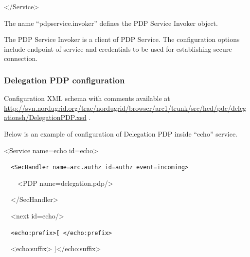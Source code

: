 \documentclass{article}
\begin{document}
{\ttfamily\color{black}
{\textless}/Service{\textgreater}}

{\upshape\color{black}
The name {\textquotedblleft}pdpservice.invoker{\textquotedblright}
defines the PDP Service Invoker object.}

{\color{black}
The PDP Service Invoker is a client of PDP Service. The configuration
options include endpoint of service and credentials to be used for
establishing secure connection.}


\bigskip

\subsubsection{Delegation PDP configuration}
{\upshape\color{black}
Configuration XML schema with comments available at
\url{http://svn.nordugrid.org/trac/nordugrid/browser/arc1/trunk/src/hed/pdc/delegationsh/DelegationPDP.xsd}
.}

{\upshape\color{black}
Below is an example of configuration of Delegation PDP inside
{\textquotedblleft}echo{\textquotedblright} service.}

{\ttfamily\color{black}
{\textless}Service name={\textquotedbl}echo{\textquotedbl}
id={\textquotedbl}echo{\textquotedbl}{\textgreater}}

{\upshape\color{black}
\foreignlanguage{spanish}{\texttt{\ \ }}\texttt{{\textless}SecHandler
name={\textquotedbl}arc.authz{\textquotedbl}
id={\textquotedbl}authz{\textquotedbl}
event={\textquotedbl}incoming{\textquotedbl}{\textgreater}}}

{\ttfamily\color{black}
\ \ \ \ {\textless}PDP
name={\textquotedbl}delegation.pdp{\textquotedbl}/{\textgreater}}

{\ttfamily\color{black}
\ \ {\textless}/SecHandler{\textgreater}}

{\ttfamily\color{black}
\ \ {\textless}next
id={\textquotedbl}echo{\textquotedbl}/{\textgreater}}

{\upshape\color{black}
\texttt{\ \ }\foreignlanguage{spanish}{\texttt{{\textless}echo:prefix{\textgreater}[
{\textless}/echo:prefix{\textgreater}}}}

{\ttfamily\color{black}
\ \ {\textless}echo:suffix{\textgreater}
]{\textless}/echo:suffix{\textgreater}}
\end{document}
